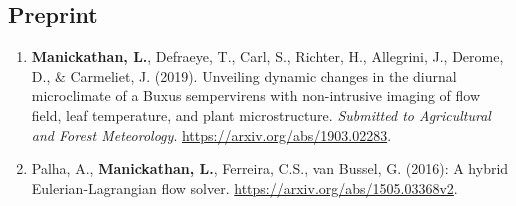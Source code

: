 \subsection*{Preprint}

\begin{enumerate}
	\item \textbf{Manickathan, L.}, Defraeye, T., Carl, S., Richter, H., Allegrini, J., Derome, D., \& Carmeliet, J. (2019). Unveiling dynamic changes in the diurnal microclimate of a Buxus sempervirens with non-intrusive imaging of flow field, leaf temperature, and plant microstructure. \textit{Submitted to Agricultural and Forest Meteorology}. \url{https://arxiv.org/abs/1903.02283}.
	
	\item Palha, A., \textbf{Manickathan, L.}, Ferreira, C.S., van Bussel, G. (2016): A hybrid Eulerian-Lagrangian flow solver. \url{https://arxiv.org/abs/1505.03368v2}.
\end{enumerate}
